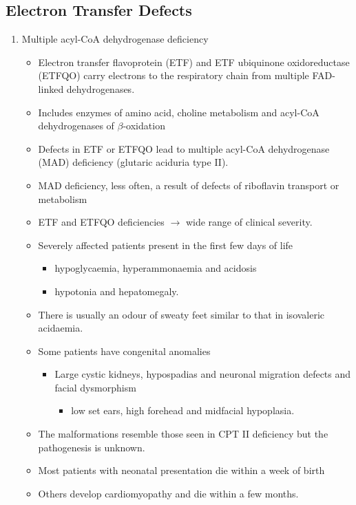 \documentclass{scrartcl}
\begin{document}
\subsection{Electron Transfer Defects}
\label{sec:orgcc59c05}
\begin{enumerate}
\item Multiple acyl-CoA dehydrogenase deficiency
\label{sec:org19fe503}
\begin{itemize}
\item Electron transfer flavoprotein (ETF) and ETF ubiquinone
oxidoreductase (ETFQO) carry electrons to the respiratory chain from
multiple FAD-linked dehydrogenases.
\item Includes enzymes of amino acid, choline metabolism and acyl-CoA
dehydrogenases of \(\beta\)-oxidation
\item Defects in ETF or ETFQO lead to multiple acyl-CoA dehydrogenase
(MAD) deficiency (glutaric aciduria type II).
\item MAD deficiency, less often, a result of defects of riboflavin
transport or metabolism
\item ETF and ETFQO deficiencies \(\to\) wide range of clinical severity.
\item Severely affected patients present in the first few days of life
\begin{itemize}
\item hypoglycaemia, hyperammonaemia and acidosis
\item hypotonia and hepatomegaly.
\end{itemize}
\item There is usually an odour of sweaty feet similar to that in isovaleric acidaemia.
\item Some patients have congenital anomalies
\begin{itemize}
\item Large cystic kidneys, hypospadias and neuronal migration defects and facial dysmorphism
\begin{itemize}
\item low set ears, high forehead and midfacial hypoplasia.
\end{itemize}
\end{itemize}
\item The malformations resemble those seen in CPT II deficiency but the pathogenesis is unknown.
\item Most patients with neonatal presentation die within a week of birth
\item Others develop cardiomyopathy and die within a few months.

\end{itemize}
\end{enumerate}
\end{document}
